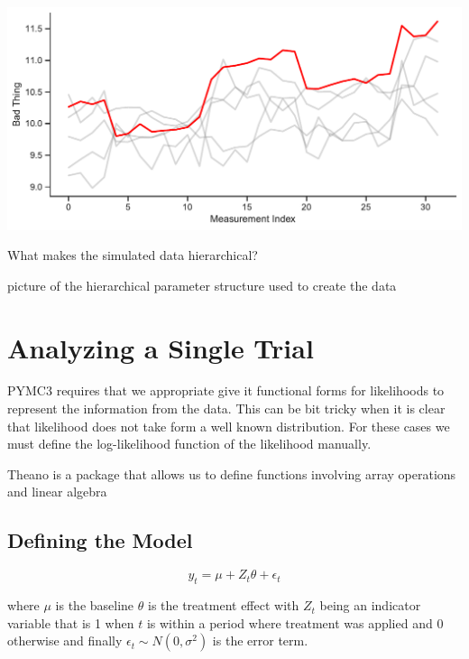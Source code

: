 \documentclass[12pt,a4paper,leqno]{report}
\theoremstyle{plain}
\theoremstyle{definition}
\theoremstyle{remark}
\begin{document}
\bigskip
{
    \centering
    \includegraphics[width=\textwidth,height=\textheight,keepaspectratio]{measurements_timeline.pdf}
    \par
}
\bigskip



What makes the simulated data hierarchical?

picture of the hierarchical parameter structure used to create the data

\section{Analyzing a Single Trial}\label{1trial}

PYMC3 requires that we appropriate give it functional forms for likelihoods to
represent the information from the data. This can be bit tricky when it is clear
that likelihood does not take form a well known distribution. For these cases we
must define the log-likelihood function of the likelihood manually.

Theano is a package that allows us to define functions involving array
operations and linear algebra

\subsection{Defining the Model}\label{1model}

\begin{def}\label{simulationmodel}
    \begin{equation}\label{}
        y_t = \mu + Z_t\theta + \epsilon_t
    \end{equation}
\end{def}where \(\mu\) is the baseline \(\theta\) is the treatment effect with
\(Z_t\) being an indicator variable that is 1 when \(t\) is within a period
where treatment was applied and 0 otherwise and finally \(\epsilon_t \sim
N(0,\sigma^2) \) is the error term.
\end{document}
